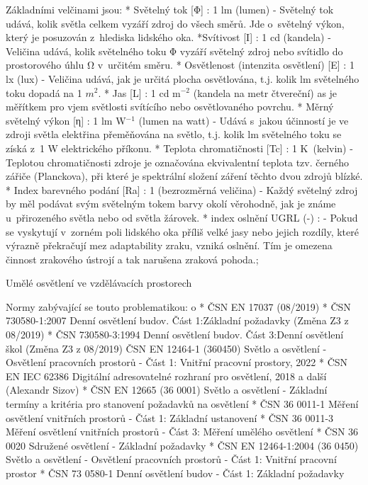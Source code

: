 \medskip
Základními velčinami jsou:    %
\begitems
* {\sbf Světelný tok [Φ]} : 1 lm (lumen) - Světelný tok udává, kolik světla celkem vyzáří zdroj do všech směrů.
    Jde o~světelný výkon, který je posuzován z~hlediska lidského oka.
*{\sbf Svítivost [I]} : 1 cd (kandela) - Veličina udává, kolik světelného toku Φ vyzáří světelný zdroj nebo svítidlo
    do prostorového úhlu Ω v~určitém směru.
* {\sbf Osvětlenost (intenzita osvětlení) [E]} : 1 lx (lux) - Veličina udává, jak je určitá plocha osvětlována,
    t.j. kolik lm světelného toku dopadá na 1 $m^2$.
* {\sbf Jas [L]} : 1 cd m$^{-2}$ (kandela na metr čtvereční)
    as je měřítkem pro vjem světlosti svítícího nebo osvětlovaného povrchu.
* {\sbf Měrný světelný výkon [η]} : 1 lm W$^{-1}$ (lumen na watt) -
    Udává s~jakou účinností je ve zdroji světla elektřina přeměňována na světlo, t.j. kolik
    lm světelného toku se získá z~1 W elektrického příkonu.
* {\sbf Teplota chromatičnosti [Tc]} : 1 K~(kelvin) - Teplotou chromatičnosti zdroje je označována ekvivalentní
    teplota tzv. černého zářiče (Planckova), při které je spektrální složení záření těchto dvou zdrojů blízké.
* {\sbf Index barevného podání [Ra]} : 1 (bezrozměrná veličina) -
    Každý světelný zdroj by měl podávat svým světelným tokem barvy okolí věrohodně, jak je známe u~přirozeného
    světla nebo od světla žárovek.
* {\sbf index oslnění UGRL (-)} : - Pokud se vyskytují v~zorném poli lidského oka příliš velké jasy nebo jejich
    rozdíly, které výrazně překračují mez adaptability zraku, vzniká oslnění. Tím je omezena činnost zrakového ústrojí a
    tak narušena zraková pohoda.;
\enditems

\sec Umělé osvětlení ve vzdělávacích prostorech

Normy zabývající se touto problematikou:
\begitems \style o
* ČSN EN 17037 (08/2019)
* ČSN 730580-1:2007 Denní osvětlení budov. Část 1:Základní požadavky (Změna Z3 z 08/2019)
* ČSN 730580-3:1994 Denní osvětlení budov. Část 3:Denní osvětlení škol (Změna Z3 z 08/2019)
ČSN EN 12464-1 (360450) Světlo a osvětlení - Osvětlení pracovních prostorů - Část 1: Vnitřní pracovní prostory, 2022
* ČSN EN IEC 62386 Digitální adresovatelné rozhraní pro osvětlení, 2018 a další (Alexandr Sizov)
* ČSN EN 12665 (36 0001) Světlo a osvětlení - Základní termíny a kritéria pro stanovení požadavků na osvětlení
* ČSN 36 0011-1 Měření osvětlení vnitřních prostorů - Část 1: Základní ustanovení
* ČSN 36 0011-3 Měření osvětlení vnitřních prostorů - Část 3: Měření umělého osvětlení
* ČSN 36 0020 Sdružené osvětlení - Základní požadavky
* ČSN EN 12464-1:2004 (36 0450) Světlo a osvětlení - Osvětlení pracovních prostorů - Část 1: Vnitřní pracovní prostor
* ČSN 73 0580-1 Denní osvětlení budov - Část 1: Základní požadavky
\enditems



